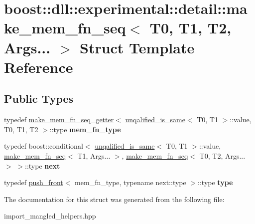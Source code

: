 \hypertarget{a00202}{}\section{boost\+:\+:dll\+:\+:experimental\+:\+:detail\+:\+:make\+\_\+mem\+\_\+fn\+\_\+seq$<$ T0, T1, T2, Args... $>$ Struct Template Reference}
\label{a00202}
\subsection*{Public Types}
\begin{DoxyCompactItemize}
\item 
typedef \hyperlink{a00203}{make\+\_\+mem\+\_\+fn\+\_\+seq\+\_\+getter}$<$ \hyperlink{a00325}{unqalified\+\_\+is\+\_\+same}$<$ T0, T1 $>$\+::value, T0, T1, T2 $>$\+::type {\bfseries mem\+\_\+fn\+\_\+type}\hypertarget{a00202_af17ba7fcbbb91b95950b5deaa88ffefa}{}\label{a00202_af17ba7fcbbb91b95950b5deaa88ffefa}

\item 
typedef boost\+::conditional$<$ \hyperlink{a00325}{unqalified\+\_\+is\+\_\+same}$<$ T0, T1 $>$\+::value, \hyperlink{a00199}{make\+\_\+mem\+\_\+fn\+\_\+seq}$<$ T1, Args... $>$, \hyperlink{a00199}{make\+\_\+mem\+\_\+fn\+\_\+seq}$<$ T0, T2, Args... $>$ $>$\+::type {\bfseries next}\hypertarget{a00202_a65d38d57fd7410f8455cc06babbc0cfc}{}\label{a00202_a65d38d57fd7410f8455cc06babbc0cfc}

\item 
typedef \hyperlink{a00236}{push\+\_\+front}$<$ mem\+\_\+fn\+\_\+type, typename next\+::type $>$\+::type {\bfseries type}\hypertarget{a00202_a8a88cbd91c8e39bf89ce45f3aecc66d7}{}\label{a00202_a8a88cbd91c8e39bf89ce45f3aecc66d7}

\end{DoxyCompactItemize}


The documentation for this struct was generated from the following file\+:\begin{DoxyCompactItemize}
\item 
import\+\_\+mangled\+\_\+helpers.\+hpp\end{DoxyCompactItemize}
